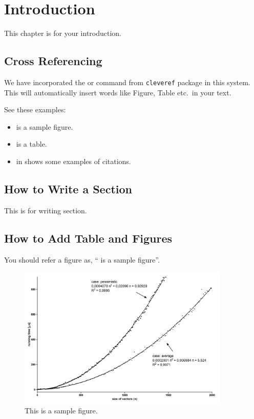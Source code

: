\chapter{Introduction}\label{intro}

This chapter is for your introduction.

\section{Cross Referencing}
We have incorporated the \verb@\cref@ or \verb@\Cref@ command from
\texttt{cleveref} package in this system. This will automatically
insert words like Figure, Table etc.\ in your text.

See these examples:
\begin{itemize}
\item {} is a sample figure.
\item {} is a table.
\item {} in  shows some examples of
  citations.
\end{itemize}

\section{How to Write a Section}

This is for writing section.

\section{How to Add Table and Figures}\label{contribution}
You should refer a figure as, `` is a sample
figure''.

\begin{figure}[!tb]
  \centering
  \includegraphics[width=0.9\textwidth]{figures/sample}
  \caption{This is a sample figure.}
  \label{fig:sample}
\end{figure}

